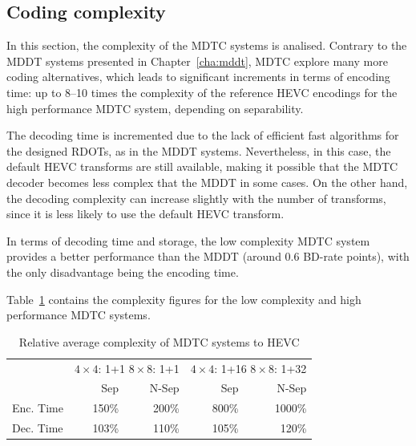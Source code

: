 \documentclass[11pt,a4paper,openright,twoside]{book}
\numberwithin{equation}{section} %
\numberwithin{figure}{section} %
\numberwithin{table}{section} %
\begin{document}
\subsection{Coding complexity}
\label{sub:mdtc_coding_complexity}

In this section, the complexity of the \ac{MDTC} systems is analised.
Contrary to the \ac{MDDT} systems presented in
Chapter~\ref{cha:mddt}, \ac{MDTC} explore many more coding alternatives, which
leads to significant increments in terms of encoding time: up to 8--10 times
the complexity of the reference \ac{HEVC} encodings for the high performance
\acs{MDTC} system, depending on separability.

The decoding time is incremented due to the lack of efficient fast algorithms
for the designed \acp{RDOT}, as in the \ac{MDDT} systems.
Nevertheless, in this case, the default \ac{HEVC} transforms are still
available, making it possible that the \ac{MDTC} decoder becomes less complex
that the \ac{MDDT} in some cases.
On the other hand, the decoding complexity can increase slightly with the
number of transforms, since it is less likely to use the default \ac{HEVC}
transform.

In terms of decoding time and storage, the low complexity \ac{MDTC} system
provides a better performance than the \ac{MDDT} (around 0.6 \ac{BD}-rate
points), with the only disadvantage being the encoding time.

Table~\ref{tab:mdtc_complexity} contains the complexity figures for the low
complexity and high performance \ac{MDTC} systems.

\begin{table}
	\centering
	\small
	\begin{tabular}{l|rr|rr}
		\multicolumn{1}{c|}{} &
		\multicolumn{2}{c|}{\multirow{2}{2cm}{\centering $4\times4$: 1+1 $8\times8$: 1+1}} &
		\multicolumn{2}{c}{\multirow{2}{2cm}{\centering $4\times4$: 1+16 $8\times8$: 1+32}} \\
		& & & & \\
		\cline{2-5}
		& Sep & N-Sep & Sep & N-Sep \\
		\hline
		\hline
		Enc. Time & 150\% & 200\% & 800\% & 1000\% \\
		Dec. Time & 103\% & 110\% & 105\% & 120\% \\
	\end{tabular}
	\caption{Relative average complexity of \acs{MDTC} systems to \acs{HEVC}}
	\label{tab:mdtc_complexity}
\end{table}
\end{document}
